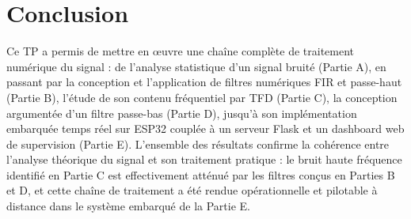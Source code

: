 \documentclass[11pt,a4paper]{article}
\begin{document}
\newpage
\section{Conclusion}

Ce TP a permis de mettre en œuvre une chaîne complète de traitement numérique du signal : de l'analyse statistique d'un signal bruité (Partie A), en passant par la conception et l'application de filtres numériques FIR et passe-haut (Partie B), l'étude de son contenu fréquentiel par TFD (Partie C), la conception argumentée d'un filtre passe-bas (Partie D), jusqu'à son implémentation embarquée temps réel sur ESP32 couplée à un serveur Flask et un dashboard web de supervision (Partie E). L'ensemble des résultats confirme la cohérence entre l'analyse théorique du signal et son traitement pratique : le bruit haute fréquence identifié en Partie C est effectivement atténué par les filtres conçus en Parties B et D, et cette chaîne de traitement a été rendue opérationnelle et pilotable à distance dans le système embarqué de la Partie E.
\end{document}
